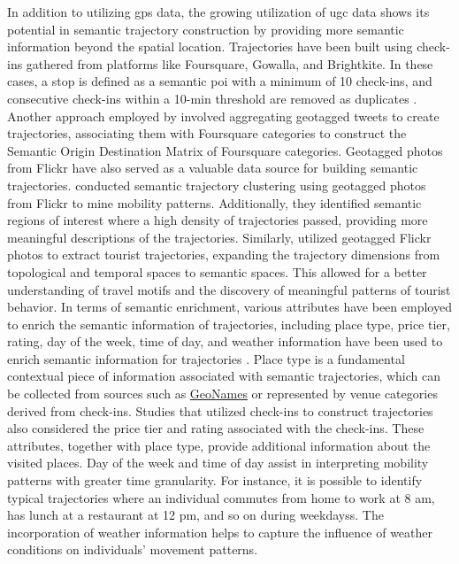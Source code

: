 \documentclass{article}
\begin{document}
In addition to utilizing \acrshort{gps} data, the growing utilization of \acrshort{ugc} data shows its potential in semantic trajectory construction by providing more semantic information beyond the spatial location. Trajectories have been built using check-ins gathered from platforms like Foursquare, Gowalla, and Brightkite. In these cases, a stop is defined as a semantic \acrshort{poi} with a minimum of 10 check-ins, and consecutive check-ins within a 10-min threshold are removed as duplicates \citep{petry_towards_2019,ferrero_mastermovelets_2020}. Another approach employed by \cite{nin_tweets_2014} involved aggregating geotagged tweets to create trajectories, associating them with Foursquare categories to construct the Semantic Origin Destination Matrix of Foursquare categories. Geotagged photos from Flickr have also served as a valuable data source for building semantic trajectories. \cite{cai_mining_2018} conducted semantic trajectory clustering using geotagged photos from Flickr to mine mobility patterns. Additionally, they identified semantic regions of interest where a high density of trajectories passed, providing more meaningful descriptions of the trajectories. Similarly, \cite{yang_quantifying_2017} utilized geotagged Flickr photos to extract tourist trajectories, expanding the trajectory dimensions from topological and temporal spaces to semantic spaces. This allowed for a better understanding of travel motifs and the discovery of meaningful patterns of tourist behavior. In terms of semantic enrichment, various attributes have been employed to enrich the semantic information of trajectories, including place type, price tier, rating, day of the week, time of day, and weather information have been used to enrich semantic information for trajectories \cite{cai_mining_2018,petry_towards_2019,liu_stccd_2020,ferrero_mastermovelets_2020}. Place type is a fundamental contextual piece of information associated with semantic trajectories, which can be collected from sources such as \href{http://www.geonames.org/}{GeoNames} or represented by venue categories derived from check-ins. Studies that utilized check-ins to construct trajectories also considered the price tier and rating associated with the check-ins. These attributes, together with place type, provide additional information about the visited places. Day of the week and time of day assist in interpreting mobility patterns with greater time granularity. For instance, it is possible to identify typical trajectories where an individual commutes from home to work at 8 am, has lunch at a restaurant at 12 pm, and so on during weekdayss. The incorporation of weather information helps to capture the influence of weather conditions on individuals' movement patterns.
\end{document}
